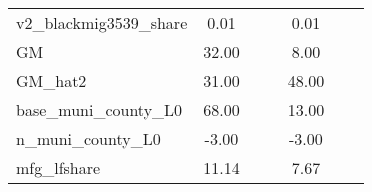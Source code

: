\begin{table}[htbp]
\begin{tabular}{l*{2}{ccc}}
v2\_blackmig3539\_share&        0.01&            &            &        0.01&            &            \\
GM                  &       32.00&            &            &        8.00&            &            \\
GM\_hat2             &       31.00&            &            &       48.00&            &            \\
base\_muni\_county\_L0 &       68.00&            &            &       13.00&            &            \\
n\_muni\_county\_L0    &       -3.00&            &            &       -3.00&            &            \\
mfg\_lfshare         &       11.14&            &            &        7.67&            &            \\
\bottomrule
\end{tabular}
\end{table}
